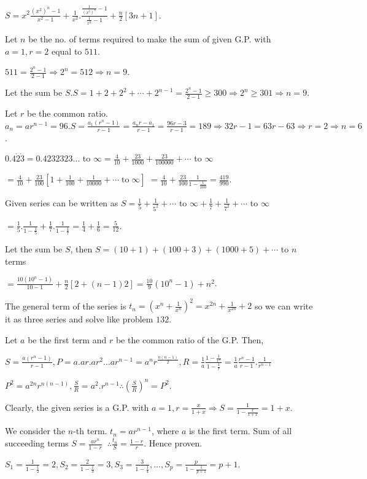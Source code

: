   $S = x^2\frac{(x^2)^n - 1}{x^2 - 1} + \frac{1}{x^2}.\frac{\frac{1}{(x^2)^n} - 1}{\frac{1}{x^2} - 1}
  + \frac{n}{2}[3n + 1]$.
\item Let $n$ be the no. of terms required to make the sum of given G.P. with $a = 1, r = 2$ equal to $511$.

  $511 = \frac{2^n - 1}{2 - 1} \Rightarrow 2^n = 512 \Rightarrow n = 9$.
\item Let the sum be $S. S = 1 + 2 + 2^2 + \cdots + 2^{n - 1} = \frac{2^n - 1}{2 - 1}\geq 300 \Rightarrow
  2^n\geq 301 \Rightarrow n = 9$.
\item Let $r$ be the common ratio. $a_n = ar^{n - 1} = 96. S = \frac{a_1(r^n - 1)}{r - 1} = \frac{a_nr -
  a_1}{r - 1} = \frac{96r - 3}{r - 1} = 189 \Rightarrow 32r - 1 = 63r - 63 \Rightarrow r = 2 \Rightarrow n =
  6$.
\item $0.4\dot{2}\dot{3} = 0.4232323\ldots$ to $\infty = \frac{4}{10} + \frac{23}{1000} + \frac{23}{100000}
  + \cdots$ to $\infty$

  $= \frac{4}{10} + \frac{23}{100}\left[1 + \frac{1}{100} + \frac{1}{10000} +
    \cdots\mathrm{\;to\;}\infty\right]$
  $= \frac{4}{10} + \frac{23}{100}\frac{1}{1 - \frac{1}{100}} = \frac{419}{990}$.
\item Given series can be written as $S = \frac{1}{5} + \frac{1}{5^2} + \cdots$ to $\infty + \frac{1}{7} +
  \frac{1}{7^2} + \cdots $ to $\infty$

  $= \frac{1}{5}.\frac{1}{1 - \frac{1}{5}} + \frac{1}{7}.\frac{1}{1 - \frac{1}{7}} = \frac{1}{4} +
  \frac{1}{6} = \frac{5}{12}$.
\item Let the sum be $S$, then $S = (10 + 1) + (100 + 3) + (1000 + 5) + \cdots$ to $n$ terms

  $= \frac{10(10^n - 1)}{10 - 1} + \frac{n}{2}[2 + (n - 1)2] = \frac{10}{9}(10^n - 1) + n^2$.
\item The general term of the series is $t_n = \left(x^n + \frac{1}{x^n}\right)^2 = x^{2n} +
  \frac{1}{x^{2n}} + 2$ so we can write it as three series and solve like problem $132$.
\item Let $a$ be the first term and $r$ be the common ratio of the G.P. Then,

  $S = \frac{a(r^n - 1)}{r - 1}, P = a.ar.ar^2\ldots ar^{n - 1} = a^nr^{\tfrac{n(n - 1)}{2}}, R =
  \frac{1}{a}\frac{1 - \frac{1}{r^n}}{1 - \frac{1}{r}} = \frac{1}{a}\frac{r^n - 1}{r - 1}.\frac{1}{r^{n -
  1}}$

  $P^2 = a^{2n}r^{n(n - 1)}, \frac{S}{R} = a^2.r^{n - 1}\therefore  \left(\frac{S}{R}\right)^n = P^2$.
\item Clearly, the given series is a G.P. with $a = 1, r = \frac{x}{1 + x} \Rightarrow S = \frac{1}{1 -
  \frac{x}{1 + x}} = 1 + x$.
\item We consider the $n$-th term. $t_n = ar^{n - 1}$, where $a$ is the first term. Sum of all succeeding
  terms $S = \frac{ar^n}{1 - r}\;\;\therefore \frac{t_n}{S} = \frac{1 - r}{r}$. Hence proven.
\item $S_1 = \frac{1}{1 - \frac{1}{2}} = 2, S_2 = \frac{2}{1 - \frac{1}{3}} = 3, S_3 = \frac{3}{1 -
  \frac{1}{4}}, \ldots, S_p = \frac{p}{1 - \frac{1}{p + 1}} = p + 1$.

